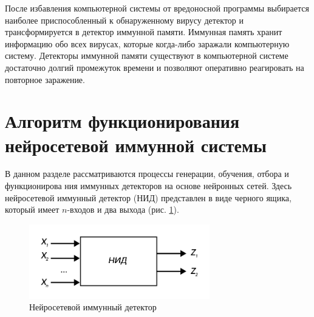 \documentclass[bachelor, och, referat]{template}
\begin{document}
После избавления компьютерной системы от вредоносной программы
выбирается наиболее приспособленный к обнаруженному вирусу детек­тор 
и трансформируется в детектор иммунной памяти. Иммунная память
хранит информацию обо всех вирусах, которые когда-либо заражали 
ком­пьютерную систему. Детекторы иммунной памяти существуют в 
компью­терной системе достаточно долгий промежуток времени и позволяют 
опе­ративно реагировать на повторное заражение.






\section{Алгоритм функционирования нейросетевой иммунной системы}

В данном разделе рассматриваются процессы генерации, обучения, отбора и функционирова­
ния иммунных детекторов на основе нейронных сетей. Здесь 
нейросетевой иммунный детектор (НИД) представлен в виде черного ящика, который
имеет $n$-входов и два выхода (рис. \ref{nid}).

\begin{figure}[H]
    \centering
    \includegraphics[width=0.7\textwidth]{pics/nid.png}
    \caption{Нейросетевой иммунный детектор}
    \label{nid}
\end{figure} 
\end{document}
